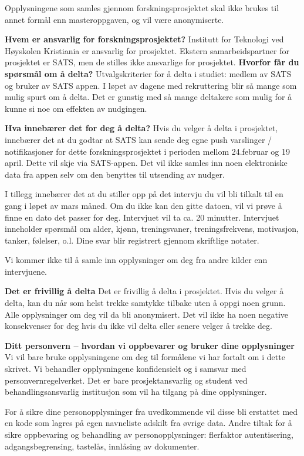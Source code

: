 Opplysningene som samles gjennom forskningsprosjektet skal ikke brukes til annet formål enn masteroppgaven, og vil være anonymiserte. 
\bigbreak

\textbf{Hvem er ansvarlig for forskningsprosjektet?}
\bigbreak
Institutt for Teknologi ved Høyskolen Kristiania er ansvarlig for prosjektet.
Ekstern samarbeidspartner for prosjektet er SATS, men de stilles ikke ansvarlige for prosjektet.  
\textbf{Hvorfor får du spørsmål om å delta?}
\bigbreak
Utvalgskriterier for å delta i studiet: medlem av SATS og bruker av SATS appen. 
I løpet av dagene med rekruttering blir så mange som mulig spurt om å delta. Det er gunstig med så mange deltakere som mulig for å kunne si noe om effekten av nudgingen. 
 
\textbf{Hva innebærer det for deg å delta?}
\bigbreak
Hvis du velger å delta i prosjektet, innebærer det at du godtar at SATS kan sende deg egne push varslinger / notifikasjoner for dette forskningsprosjektet i perioden mellom 24.februar og 19 april. Dette vil skje via SATS-appen. Det vil ikke samles inn noen elektroniske data fra appen selv om den benyttes til utsending av nudger.

I tillegg innebærer det at du stiller opp på det intervju du vil bli tilkalt til en gang i løpet av mars måned. Om du ikke kan den gitte datoen, vil vi prøve å finne en dato det passer for deg. Intervjuet vil ta ca. 20 minutter. Intervjuet inneholder spørsmål om alder, kjønn, treningsvaner, treningsfrekvens, motivasjon, tanker, følelser, o.l. Dine svar blir registrert gjennom skriftlige notater. 

Vi kommer ikke til å samle inn opplysninger om deg fra andre kilder enn intervjuene.  
 
\textbf{Det er frivillig å delta}
\bigbreak
Det er frivillig å delta i prosjektet. Hvis du velger å delta, kan du når som helst trekke samtykke tilbake uten å oppgi noen grunn. Alle opplysninger om deg vil da bli anonymisert. Det vil ikke ha noen negative konsekvenser for deg hvis du ikke vil delta eller senere velger å trekke deg.
 
\textbf{Ditt personvern – hvordan vi oppbevarer og bruker dine opplysninger}
\bigbreak
Vi vil bare bruke opplysningene om deg til formålene vi har fortalt om i dette skrivet. Vi behandler opplysningene konfidensielt og i samsvar med personvernregelverket.
Det er bare prosjektansvarlig og student ved behandlingsansvarlig institusjon som vil ha tilgang på dine opplysninger.

For å sikre dine personopplysninger fra uvedkommende vil disse bli erstattet med en kode som lagres på egen navneliste adskilt fra øvrige data. Andre tiltak for å sikre oppbevaring og behandling av personopplysninger: flerfaktor autentisering, adgangsbegrensing, tastelås, innlåsing av dokumenter.  

